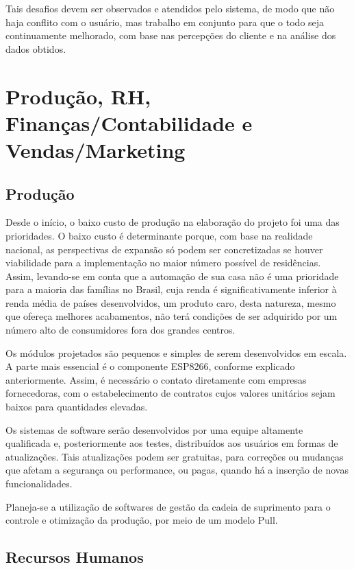 Tais desafios devem ser observados e atendidos pelo sistema, de modo que não haja conflito com o usuário, mas trabalho em conjunto para que o todo seja continuamente melhorado, com base nas percepções do cliente e na análise dos dados obtidos.

\section{Produção, RH, Finanças/Contabilidade e Vendas/Marketing}

\subsection{Produção}

Desde o início, o baixo custo de produção na elaboração do projeto foi uma das prioridades. O baixo custo é determinante porque, com base na realidade nacional, as perspectivas de expansão só podem ser concretizadas se houver viabilidade para a implementação no maior número possível de residências. Assim, levando-se em conta que a automação de sua casa não é uma prioridade para a maioria das famílias no Brasil, cuja renda é significativamente inferior à renda média de países desenvolvidos, um produto caro, desta natureza, mesmo que ofereça melhores acabamentos, não terá condições de ser adquirido por um número alto de consumidores fora dos grandes centros.

Os módulos projetados são pequenos e simples de serem desenvolvidos em escala. A parte mais essencial é o componente ESP8266, conforme explicado anteriormente. Assim, é necessário o contato diretamente com empresas fornecedoras, com o estabelecimento de contratos cujos valores unitários sejam baixos para quantidades elevadas.

Os sistemas de software serão desenvolvidos por uma equipe altamente qualificada e, posteriormente aos testes, distribuídos aos usuários em formas de atualizações. Tais atualizações podem ser gratuitas, para correções ou mudanças que afetam a segurança ou performance, ou pagas, quando há a inserção de novas funcionalidades.

Planeja-se a utilização de softwares de gestão da cadeia de suprimento para o controle e otimização da produção, por meio de um modelo Pull.

\subsection{Recursos Humanos}

